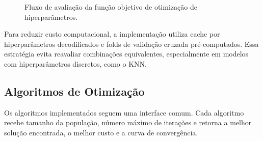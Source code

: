 \begin{figure}[htbp]
\centering
{}
\caption{Fluxo de avaliação da função objetivo de otimização de hiperparâmetros.}
\label{fig:fluxo-hpo}
\end{figure}

Para reduzir custo computacional, a implementação utiliza cache por hiperparâmetros decodificados e folds de validação cruzada pré-computados. Essa estratégia evita reavaliar combinações equivalentes, especialmente em modelos com hiperparâmetros discretos, como o KNN.

\subsection{Algoritmos de Otimização}

Os algoritmos implementados seguem uma interface comum. Cada algoritmo recebe tamanho da população, número máximo de iterações e retorna a melhor solução encontrada, o melhor custo e a curva de convergência.

